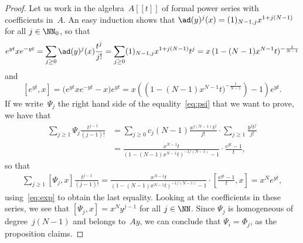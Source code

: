 \begin{proof}
Let us work in the algebra~$A[[t]]$ of formal power series with
coefficients in~$A$. An easy induction shows that
$\ad(y)^j(x) = (1)_{N-1,j}x^{1+j(N-1)}$
for all $j\in\NN_0$, so that
  \[
  e^{yt}xe^{-yt} 
        = \sum_{j\geq0}\ad(y)^j(x)\frac{t^j}{j!} 
        = \sum_{j\geq0}(1)_{N-1,j}x^{1+j(N-1)}t^j 
        = x\,(1-(N-1)x^{N-1}t)^{-\frac{1}{N-1}}
  \]
and
  \[ \label{eq:exp}
  [e^{yt},x] 
        = \bigl(e^{yt}xe^{-yt}-x\bigr)e^{yt}
        = x\left(
                \left(1-(N-1)x^{N-1}t)^{-\frac{1}{N-1}}\right)
                -1
           \right)e^{yt}.
  \]
If we write~$\Psi_j$ the right hand side of the equality~\eqref{eq:psi}
that we want to prove, we have that
  \begin{align}
  \sum_{j\geq1}\Psi_j\frac{t^{j-1}}{(j-1)!}
  &= \sum_{j\geq0}c_j(N-1)\frac{x^{j(N-1)}t^j}{j!}
      \cdot
      \sum_{j\geq1} \frac{y^jt^j}{j!} \\
  &= \frac{x^{N-1}t}{(1-(N-1)x^{N-1}t)^{-1/(N-1)}-1}
     \cdot
     \frac{e^{yt}-1}{t}, 
  \end{align}
so that
  \begin{align}
  \sum_{j\geq1}[\Psi_j,x]\frac{t^{j-1}}{(j-1)!}
   = \frac{x^{N-1}t}{(1-(N-1)x^{N-1}t)^{-1/(N-1)}-1}
     \cdot
     \left[\frac{e^{yt}-1}{t},x\right]
   = x^{N}e^{yt},
  \end{align}
using~\eqref{eq:exp} to obtain the last equality. Looking at the
coefficients in these series, we see that $[\Psi_j,x]=x^Ny^{j-1}$ for all
$j\in\NN$. Since $\Psi_j$ is homogeneous of degree~$j(N-1)$ and belongs
to~$Ay$, we can conclude that $\Psi_i=\Phi_j$, as the proposition claims.
\end{proof}


